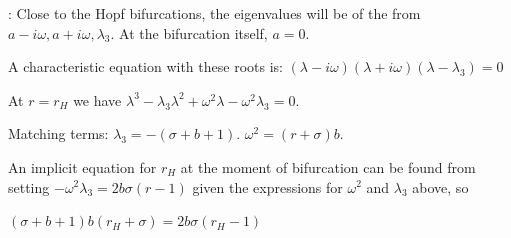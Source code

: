 \documentclass[12pt,letterpaper,noanswers]{exam}
\begin{document}
: Close to the Hopf bifurcations, the eigenvalues will be of the from $a - i\omega, a + i\omega, \lambda_3$.  At the bifurcation itself, $a = 0$.

A characteristic equation with these roots is:
$(\lambda - i\omega)(\lambda+i\omega)(\lambda-\lambda_3) = 0$

At $r = r_H$ we have $\lambda^3 - \lambda_3 \lambda^2 + \omega^2 \lambda - \omega^2\lambda_3 = 0$.

Matching terms: $\lambda_3 = -(\sigma + b +1)$.  $\omega^2 = (r+\sigma)b$.  

An implicit equation for $r_H$ at the moment of bifurcation can be found from setting $-\omega^2\lambda_3 = 2b\sigma(r-1)$ given the expressions for $\omega^2$ and $\lambda_3$ above, so 

$(\sigma+b+1)b(r_H+\sigma) = 2b\sigma(r_H-1)$
\end{document}
